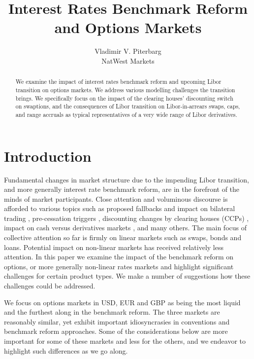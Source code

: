 \documentclass{article}
\begin{document}
\title{Interest Rates Benchmark Reform and Options Markets}
\author{Vladimir V. Piterbarg \\
NatWest Markets}
\maketitle

\begin{abstract}
We examine the impact of interest rates benchmark reform and upcoming Libor
transition on options markets. We address various modelling challenges the
transition brings. We specifically focus on the impact of the clearing
houses' discounting switch on swaptions, and the consequences of Libor
transition on Libor-in-arrears swaps, caps, and range accruals as typical
representatives of a very wide range of Libor derivatives.
\end{abstract}

\section{Introduction}

Fundamental changes in market structure due to the impending Libor
transition, and more generally interest rate benchmark reform, are in the
forefront of the minds of market participants. Close attention and
voluminous discourse is afforded to various topics such as proposed
fallbacks and impact on bilateral trading \cite{risk-mh1}, pre-cessation
triggers \cite{risk-presess}, discounting changes by clearing houses (CCPs) 
\cite{risk-swpt}, impact on cash versus derivatives markets \cite{risk-bonds}%
, and many others. The main focus of collective attention so far is firmly
on linear markets such as swaps, bonds and loans. Potential impact on
non-linear markets has received relatively less attention. In this paper we
examine the impact of the benchmark reform on options, or more generally
non-linear rates markets and highlight significant challenges for certain
product types. We make a number of suggestions how these challenges could be
addressed.

We focus on options markets in USD, EUR and GBP as being the most liquid and
the furthest along in the benchmark reform. The three markets are reasonably
similar, yet exhibit important idiosyncrasies in conventions and benchmark
reform approaches. Some of the considerations below are more important for
some of these markets and less for the others, and we endeavor to highlight
such differences as we go along.
\end{document}
